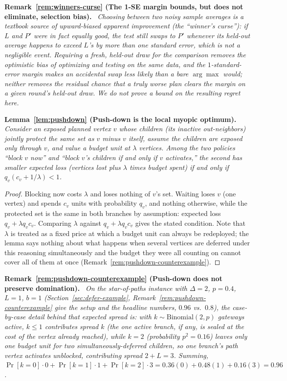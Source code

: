 \documentclass[ASNA,number]{USG}
\newenvironment{repeatlemma}[1][]{\par\medskip\noindent\textbf{#1.}\ \itshape}{\par\medskip}
\newenvironment{repeatremark}[1][]{\par\medskip\noindent\textbf{#1.}\ \itshape}{\par\medskip}
\begin{document}
\begin{repeatremark}[Remark~\ref{rem:winners-curse} (The 1-SE margin bounds, but does not eliminate, selection bias)]
Choosing between two noisy sample averages is a textbook source of
upward-biased apparent improvement (the ``winner's curse''): if $L$ and
$P'$ were in fact equally good, the test still swaps to $P'$ whenever its
held-out average happens to exceed $L$'s by more than one standard error,
which is not a negligible event. Requiring a fresh, held-out draw for the
comparison removes the optimistic bias of optimizing and testing on the
same data, and the $1$-standard-error margin makes an accidental swap less
likely than a bare $\arg\max$ would; neither removes the residual chance
that a truly worse plan clears the margin on a given round's held-out
draw. We do not prove a bound on the resulting regret here.
\end{repeatremark}

\begin{repeatlemma}[Lemma~\ref{lem:pushdown} (Push-down is the local myopic optimum)]
Consider an exposed planned vertex $v$ whose children (its inactive
out-neighbors) jointly protect the same set as $v$ minus $v$ itself, assume
the children are exposed only through $v$, and value a budget unit at
$\lambda$ vertices. Among the two policies ``block $v$ now'' and ``block
$v$'s children if and only if $v$ activates,'' the second has smaller
expected loss (vertices lost plus $\lambda$ times budget spent) if and only
if $q_v(c_v+1/\lambda)<1$.
\end{repeatlemma}
\begin{proof}
Blocking now costs $\lambda$ and loses nothing of $v$'s set. Waiting loses
$v$ (one vertex) and spends $c_v$ units with probability $q_v$, and nothing
otherwise, while the protected set is the same in both branches by
assumption: expected loss $q_v+\lambda q_v c_v$. Comparing $\lambda$ against
$q_v+\lambda q_v c_v$ gives the stated condition. Note that $\lambda$ is
treated as a fixed price at which a budget unit can always be redeployed;
the lemma says nothing about what happens when several vertices are
deferred under this reasoning simultaneously and the budget they were all
counting on cannot cover all of them at once
(Remark~\ref{rem:pushdown-counterexample}).
\end{proof}

\begin{repeatremark}[Remark~\ref{rem:pushdown-counterexample} (Push-down does not preserve domination)]
On the star-of-paths instance with $\Delta=2$, $p=0.4$, $L=1$, $b=1$
(Section~\ref{sec:defer-example}, Remark~\ref{rem:pushdown-counterexample}
give the setup and the headline numbers, $0.96$ vs.\ $0.8$), the
case-by-case detail behind that expected spread is: with
$k\sim\mathrm{Binomial}(2,p)$ gateways active, $k\le1$ contributes spread
$k$ (the one active branch, if any, is sealed at the cost of the vertex
already reached), while $k=2$ (probability $p^2=0.16$) leaves only one
budget unit for two simultaneously-deferred children, so one branch's
path vertex activates unblocked, contributing spread $2+L=3$. Summing,
$\Pr[k{=}0]\cdot0+\Pr[k{=}1]\cdot1+\Pr[k{=}2]\cdot3=0.36(0)+0.48(1)+0.16(3)=0.96$.
\end{repeatremark}
\end{document}
